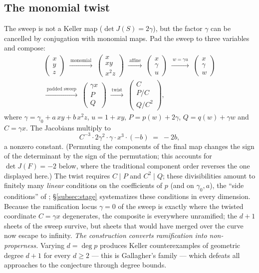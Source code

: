 \documentclass[11pt]{article}
\theoremstyle{plain}
\theoremstyle{definition}
\theoremstyle{remark}
\begin{document}
\subsection{The monomial twist}\label{subsec:twist}
The sweep is not a Keller map ($\det J(S)=2\gamma$), but the factor $\gamma$ can be
cancelled by conjugation with monomial maps. Pad the sweep to three variables and
compose:
\begin{multline*}
\begin{pmatrix}x\\ y\\ z\end{pmatrix}
\;\xrightarrow{\ \text{monomial}\ }\;
\begin{pmatrix}x\\ xy\\ x^2z\end{pmatrix}
\;\xrightarrow{\ \text{affine}\ }\;
\begin{pmatrix}x\\ \gamma\\ u\end{pmatrix}
\;\xrightarrow{\ w=\gamma u\ }\;
\begin{pmatrix}x\\ \gamma\\ w\end{pmatrix}\\
\xrightarrow{\ \text{padded sweep}\ }\;
\begin{pmatrix}\gamma x\\ P\\ Q\end{pmatrix}
\;\xrightarrow{\ \text{twist}\ }\;
\begin{pmatrix}C\\ P/C\\ Q/C^2\end{pmatrix},
\end{multline*}
where $\gamma=\gamma_0+a\,xy+b\,x^2z$, $u=1+xy$, $P=p(w)+2\gamma$,
$Q=q(w)+\gamma w$ and $C=\gamma x$. The Jacobians multiply to
\[
C^{-3}\cdot 2\gamma^2\cdot\gamma\cdot x^3\cdot(-b)\;=\;-2b,
\]
a nonzero constant. (Permuting the components of the final map changes the sign
of the determinant by the sign of the permutation; this accounts for
$\det J(F)=-2$ below, where the traditional component order reverses the one
displayed here.) The twist requires $C\mid P$ and $C^2\mid Q$; these
divisibilities amount to finitely many \emph{linear} conditions on the
coefficients of $p$ (and on $\gamma_0,a$), the ``side conditions'' of
\cite{Speyer2026}; \S\ref{subsec:stage} systematizes these conditions in every
dimension. Because the
ramification locus $\gamma=0$ of the sweep is exactly where the twisted coordinate
$C=\gamma x$ degenerates, the composite is everywhere unramified; the
$d+1$ sheets of the sweep survive, but sheets that would have merged over the
curve now escape to infinity. \emph{The construction converts ramification into
non-properness.} Varying $d=\deg p$ produces Keller counterexamples of geometric
degree $d+1$ for every $d\ge2$ --- this is Gallagher's family
\cite{Gallagher2026} --- which defeats all approaches to the conjecture through
degree bounds.
\end{document}
